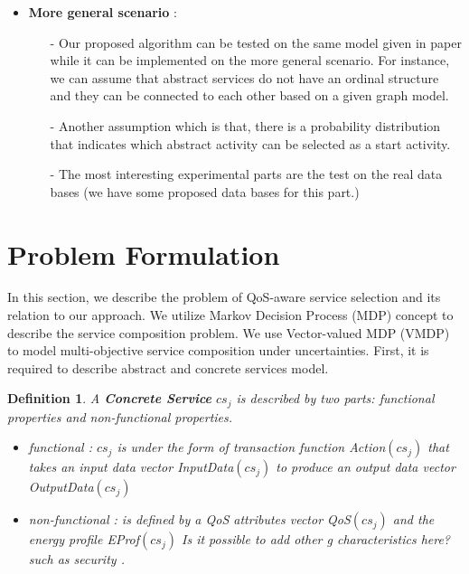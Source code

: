 \documentclass{sigchi}
\newtheorem{definition}{Definition}
\begin{document}
\begin{itemize}
\item \textbf{More general scenario} : \\
\begin{itemize}

\item[-] Our proposed algorithm can be tested on the same model given in paper \cite{DBLP:journals/tase/KhanoucheACKY16} while it can be implemented on the more general scenario. For instance, we can assume that abstract services do not have an ordinal structure and they can be connected to each other based on a given graph model. 

\item[-] Another assumption which is that, there is a probability distribution that indicates which abstract activity can be selected as a start activity. 

\item[-] The most interesting experimental parts are the test on the real data bases ({\color{red}we have some proposed data bases for this part.}) 

\end{itemize}
\end{itemize}

\section{Problem Formulation}

In this section, we describe the problem of QoS-aware service selection and its relation to our approach. We utilize Markov Decision Process (MDP) concept to describe the service composition problem. We use Vector-valued MDP (VMDP) to model multi-objective service composition under uncertainties. First, it is required to describe abstract and concrete services model. 

\begin{definition}
A \textbf{Concrete Service} $cs_j$ is described by two parts: functional properties and non-functional properties.
\begin{itemize}
\item functional : $cs_j$ is under the form of transaction function Action$(cs_j)$ that takes an input data vector InputData$(cs_j)$ to produce an output data vector OutputData$(cs_j)$ 
\item non-functional : is defined by a QoS attributes vector QoS$(cs_j)$ and the energy profile EProf$(cs_j)$ {\color{red} Is it possible to add other g
characteristics here? such as security }.  
\end{itemize}
\end{definition}
\end{document}

